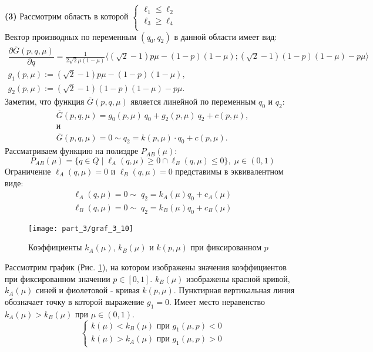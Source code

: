 \textbf{(3)}
Рассмотрим область в которой
$
\begin{cases}
	\ell_1 \leqslant \ell_2 \\	
	\ell_3 \geqslant \ell_4 \\
\end{cases}	
$\\
Вектор производных по переменным $(q_0,q_2)$ в данной области имеет вид:
\begin{gather*}
	\dfrac{\partial \overline{G}(p,q,\mu)}{\partial q}=
	\frac{1}{2\sqrt{2}\mu(1-\mu)}
	\big \langle 
		(\sqrt{2} - 1)p\mu -(1-p)(1-\mu);
		(\sqrt{2} - 1)(1-p)(1-\mu) - p\mu			
	\big \rangle
	\\
	g_1(p, \mu):=(\sqrt{2} - 1)p\mu -(1-p)(1-\mu),
	\\
	g_2(p, \mu):=(\sqrt{2} - 1)(1-p)(1-\mu) - p\mu.
\end{gather*}
Заметим, что функция $\overline{G}(p,q,\mu)$
является линейной по переменным $q_0$ и $q_2$:
\begin{gather*}
	\overline{G}(p,q,\mu)=g_0(p,\mu) \: q_0+g_2(p,\mu) \: q_2+c(p,\mu),
	\\
	\textrm{и}
	\\
	\overline{G}(p,q,\mu) = 0 \sim q_2 = k(p, \mu) \cdot q_0 + c(p, \mu).
\end{gather*}
Рассматриваем функцию на полиэдре $P_{AB}(\mu):$
$$
	P_{AB}(\mu)=
	\{
		q \in Q \; | \;  
		\ell_A(q, \mu) \geqslant 0 \cap
	 	\ell_B(q, \mu) \leqslant 0
	\} , \; \mu \in (0,1)
$$
Ограничение $\ell_A(q, \mu) = 0$ и $\ell_B(q, \mu) = 0$ представимы в 
эквивалентном виде:
\begin{gather*}
	\ell_A(q,\mu)=0 \sim \; q_2=k_A(\mu)q_0+c_A(\mu)
	\\	
	\ell_B(q,\mu)=0 \sim \; q_2=k_B(\mu)q_0+c_B(\mu)
\end{gather*}

	
\begin{figure}[H]
	\centering
  	\texttt{[image: part\_3/graf\_3\_10]}
  	\caption{
  		Коэффициенты $k_A(\mu)$, $k_B(\mu)$ и $k(p,\mu)$ 
  		при фиксированном $p$
  	}
	\label{fig:k_A,k_B,k}	
\end{figure}	
	
Рассмотрим график (Рис. \ref{fig:k_A,k_B,k}), на котором изображены значения 
коэффициентов при фиксированном значении $p \in [0,1]$. $k_B(\mu)$ изображены 
красной кривой, $k_A(\mu)$ синей и фиолетовой - кривая $k(p, \mu)$. 
Пунктирная вертикальная линия обозначает точку в которой выражение $g_1=0$.
Имеет место неравенство $k_A(\mu) > k_B(\mu)$ при $\mu \in (0,1)$.
$$
	\begin{cases}
		k(\mu) < k_B(\mu) \textrm{ при } g_1(\mu,p) < 0 \\
		k(\mu) > k_A(\mu) \textrm{ при } g_1(\mu,p) > 0 
	\end{cases}		
$$	
	
